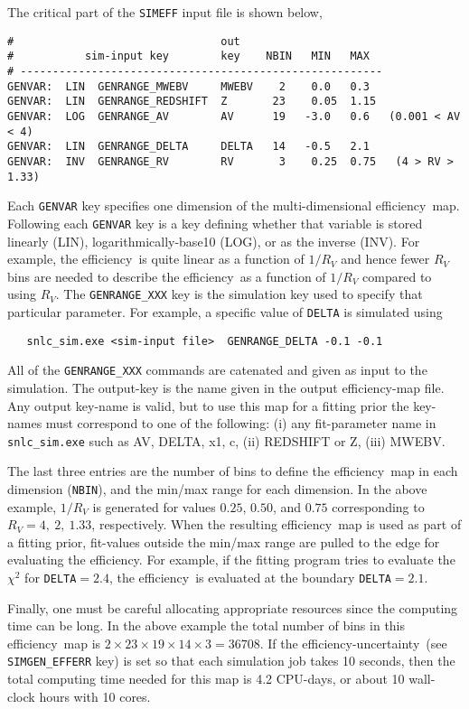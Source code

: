 \documentclass[12pt]{article}
\newcommand{\unc}{uncertainty}
\newcommand{\eff}{efficiency}
\begin{document}
The critical part of the {\tt SIMEFF} input file
is shown below,
\begin{Verbatim}[frame=single]
#                                out
#           sim-input key        key    NBIN   MIN   MAX
# --------------------------------------------------------
GENVAR:  LIN  GENRANGE_MWEBV     MWEBV    2    0.0   0.3
GENVAR:  LIN  GENRANGE_REDSHIFT  Z       23    0.05  1.15
GENVAR:  LOG  GENRANGE_AV        AV      19   -3.0   0.6   (0.001 < AV < 4)
GENVAR:  LIN  GENRANGE_DELTA     DELTA   14   -0.5   2.1
GENVAR:  INV  GENRANGE_RV        RV       3    0.25  0.75   (4 > RV > 1.33)
\end{Verbatim}
%
Each {\tt GENVAR} key specifies one dimension of the
multi-dimensional \eff\ map.
Following each {\tt GENVAR} key is a key defining whether
that variable is stored linearly (LIN), 
logarithmically-base10 (LOG), or as the inverse (INV).
For example, the \eff\ is quite linear as a function
of $1/R_V$ and hence fewer $R_V$ bins are needed to 
describe the \eff\ as a function of $1/R_V$ compared to 
using $R_V$.  The {\tt GENRANGE\_XXX} key is the simulation 
key used to specify that particular parameter. For example,
a specific value of {\tt DELTA} is simulated using
\begin{verbatim}
   snlc_sim.exe <sim-input file>  GENRANGE_DELTA -0.1 -0.1
\end{verbatim} 
%
All of the {\tt GENRANGE\_XXX} commands are catenated and
given as input to the simulation. The output-key is the 
name given in the output {\eff}-map file. Any output key-name
is valid, but to use this map for a fitting prior the
key-names must correspond to one of the following:
(i) any fit-parameter name in {\tt snlc\_sim.exe} such as
AV, DELTA, x1, c,
(ii) REDSHIFT or Z,
(iii) MWEBV.


The last three entries are the number of bins to define
the \eff\ map in each dimension ({\tt NBIN}),
and the min/max range for each dimension.
In the above example, $1/R_V$  is generated for values
$0.25$, $0.50$, and $0.75$ corresponding to $R_V = 4,~2,~1.33$,
respectively. When the resulting \eff\ map is used as part
of a fitting prior, fit-values outside the min/max range
are pulled to the edge for evaluating the \eff.
For example, if the fitting program tries to evaluate
the $\chi^2$ for {\tt DELTA}$=2.4$, the \eff\ is
evaluated at the boundary {\tt DELTA}$=2.1$.


Finally, one must be careful allocating appropriate
resources since the computing time can be long.
In the above example the total number of bins in this
\eff\ map is $2\times 23\times 19\times 14\times 3 = 36708$.
If the \eff-\unc\ (see {\tt SIMGEN\_EFFERR} key)
is set so that each simulation job takes 10 seconds,
then the total computing time needed for this map is
4.2 CPU-days, or about 10 wall-clock hours with 10 cores.
\end{document}
